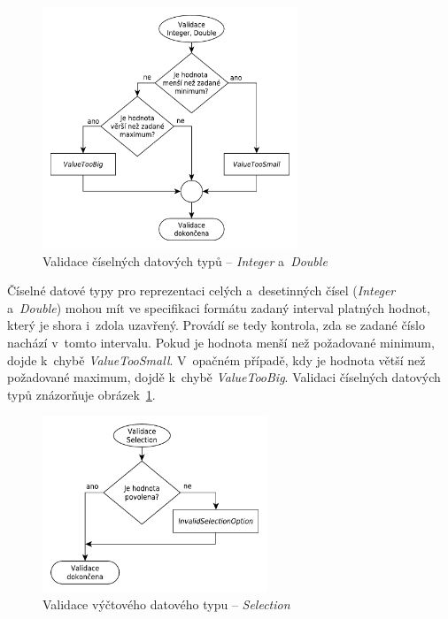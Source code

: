 \documentclass[FM,bw,DP]{tulthesis}
\begin{document}
\begin{figure}[h]
	\centering
    \includegraphics[width=0.68\textwidth]{../img/validation_number.pdf}
    \caption{Validace číselných datových typů -- \textit{Integer} a~\textit{Double}}
	\label{img:validation_number}
\end{figure}

Číselné datové typy pro reprezentaci celých a~desetinných čísel (\textit{Integer} a~\textit{Double}) mohou mít ve specifikaci formátu zadaný interval platných hodnot, který je shora i~zdola uzavřený. Provádí se tedy kontrola, zda se zadané číslo nachází v~tomto intervalu. Pokud je hodnota menší než požadované minimum, dojde k~chybě \textit{Value\-Too\-Small}. V~opačném případě, kdy je hodnota větší než požadované maximum, dojdě k~chybě \textit{ValueTooBig}. Validaci číselných datových typů znázorňuje obrázek~\ref{img:validation_number}.


\begin{figure}[h]
	\centering
    \includegraphics[width=0.6\textwidth]{../img/validation_selection.pdf}
    \caption{Validace výčtového datového typu -- \textit{Selection}}
	\label{img:validation_selection}
\end{figure}
\end{document}
